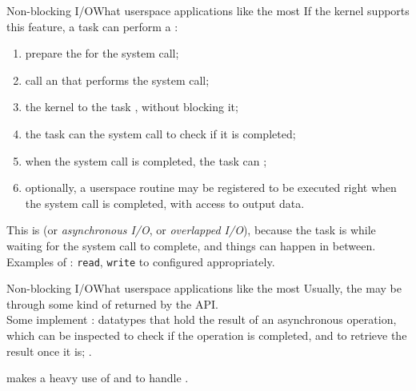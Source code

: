 \begin{frame}{Non-blocking I/O}{What userspace applications like the most}
  \justifying
  If the kernel supports this feature, a task can perform a :
  \begin{enumerate}
    \item prepare the  for the system call;
    \item call an  that performs the system call;
    \item the kernel  to the task , without blocking it;
    \item the task can  the system call  to check if it is completed;
    \item when the system call is completed, the task can ;
    \item optionally, a userspace  routine may be registered to be executed right when the system call is completed, with access to output data.
  \end{enumerate}
  This is  (or \emph{asynchronous I/O}, or \emph{overlapped I/O}), because the task is  while waiting for the system call to complete, and things can happen in between.\\
  \bigskip
  Examples of : \texttt{read}, \texttt{write} to  configured appropriately.
\end{frame}
\begin{frame}{Non-blocking I/O}{What userspace applications like the most}
  \justifying
  Usually, the  may be  through some kind of  returned by the API.\\
  \bigskip
  Some  implement : datatypes that hold the result of an asynchronous operation, which can be inspected to check if the operation is completed, and to retrieve the result once it is; .
  \bigskip
  \begin{alertblock}{}
    \centering
     makes a heavy use of  and  to handle .
  \end{alertblock}
\end{frame}
